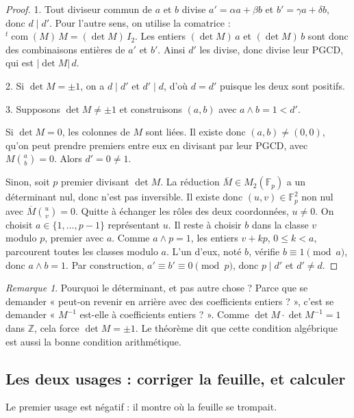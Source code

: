 \documentclass[11pt,a4paper]{article}
\theoremstyle{plain}
\theoremstyle{definition}
\theoremstyle{remark}
\newtheorem{remarque}[theoreme]{Remarque}
\newcommand{\Z}{\mathbb{Z}}
\newcommand{\F}{\mathbb{F}}
\newcommand{\pgcd}{\wedge}
\DeclareMathOperator{\com}{com}
\begin{document}
\begin{proof}
1. Tout diviseur commun de $a$ et $b$ divise $a'=\alpha a+\beta b$ et $b'=\gamma a+\delta b$, donc $d\mid d'$. Pour l'autre sens, on utilise la comatrice : ${}^t\!\com(M)\,M=(\det M)\,I_2$. Les entiers $(\det M)\,a$ et $(\det M)\,b$ sont donc des combinaisons entières de $a'$ et $b'$. Ainsi $d'$ les divise, donc divise leur PGCD, qui est $|\det M|\,d$.

2. Si $\det M=\pm1$, on a $d\mid d'$ et $d'\mid d$, d'où $d=d'$ puisque les deux sont positifs.

3. Supposons $\det M\neq\pm1$ et construisons $(a,b)$ avec $a\pgcd b=1<d'$.

Si $\det M=0$, les colonnes de $M$ sont liées. Il existe donc $(a,b)\neq(0,0)$, qu'on peut prendre premiers entre eux en divisant par leur PGCD, avec $M\binom{a}{b}=0$. Alors $d'=0\neq 1$.

Sinon, soit $p$ premier divisant $\det M$. La réduction $\overline M\in M_2(\F_p)$ a un déterminant nul, donc n'est pas inversible. Il existe donc $(u,v)\in\F_p^2$ non nul avec $\overline M\binom{u}{v}=0$. Quitte à échanger les rôles des deux coordonnées, $u\neq0$. On choisit $a\in\{1,\dots,p-1\}$ représentant $u$. Il reste à choisir $b$ dans la classe $v$ modulo $p$, premier avec $a$. Comme $a\pgcd p=1$, les entiers $v+kp$, $0\leq k<a$, parcourent toutes les classes modulo $a$. L'un d'eux, noté $b$, vérifie $b\equiv 1\pmod a$, donc $a\pgcd b=1$. Par construction, $a'\equiv b'\equiv0\pmod p$, donc $p\mid d'$ et $d'\neq d$.
\end{proof}

\begin{remarque}
Pourquoi le déterminant, et pas autre chose ? Parce que se demander « peut-on revenir en arrière avec des coefficients entiers ? », c'est se demander « $M^{-1}$ est-elle à coefficients entiers ? ». Comme $\det M\cdot\det M^{-1}=1$ dans $\Z$, cela force $\det M=\pm1$. Le théorème dit que cette condition algébrique est aussi la bonne condition arithmétique.
\end{remarque}

\subsection{Les deux usages : corriger la feuille, et calculer}

Le premier usage est négatif : il montre où la feuille se trompait.
\end{document}
